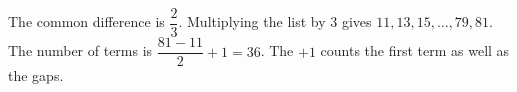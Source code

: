 The common difference is $\dfrac{2}{3}$. Multiplying the list by $3$ gives $11,13,15,\ldots,79,81$. The number of terms is $\dfrac{81-11}{2}+1=\boxed{36}$. The $+1$ counts the first term as well as the gaps.
